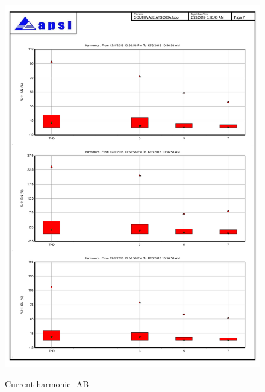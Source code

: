 \begin{figure}
	\includegraphics[width=\textwidth]{figures/fig_ch04_elecaudit_harmonicstudy04} \\
	\caption{Current harmonic -AB}
	\label{fig_ch04_elecaudit_harmonicstudy04} 
\end{figure}



